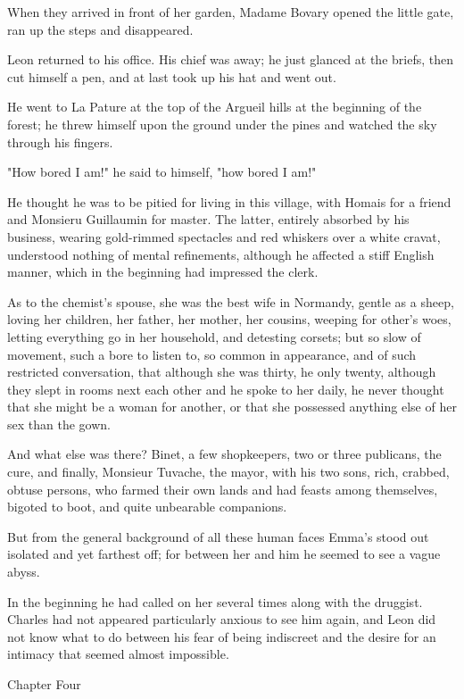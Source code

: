 \documentclass[11pt,twocolumn]{ltugboat}
\begin{document}
When they arrived in front of her garden, Madame Bovary opened the
little gate, ran up the steps and disappeared.

Leon returned to his office. His chief was away; he just glanced at the
briefs, then cut himself a pen, and at last took up his hat and went
out.

He went to La Pature at the top of the Argueil hills at the beginning of
the forest; he threw himself upon the ground under the pines and watched
the sky through his fingers.

"How bored I am!" he said to himself, "how bored I am!"

He thought he was to be pitied for living in this village, with Homais
for a friend and Monsieru Guillaumin for master. The latter, entirely
absorbed by his business, wearing gold-rimmed spectacles and red
whiskers over a white cravat, understood nothing of mental refinements,
although he affected a stiff English manner, which in the beginning had
impressed the clerk.

As to the chemist's spouse, she was the best wife in Normandy, gentle
as a sheep, loving her children, her father, her mother, her cousins,
weeping for other's woes, letting everything go in her household, and
detesting corsets; but so slow of movement, such a bore to listen to, so
common in appearance, and of such restricted conversation, that although
she was thirty, he only twenty, although they slept in rooms next each
other and he spoke to her daily, he never thought that she might be a
woman for another, or that she possessed anything else of her sex than
the gown.

And what else was there? Binet, a few shopkeepers, two or three
publicans, the cure, and finally, Monsieur Tuvache, the mayor, with his
two sons, rich, crabbed, obtuse persons, who farmed their own lands
and had feasts among themselves, bigoted to boot, and quite unbearable
companions.

But from the general background of all these human faces Emma's stood
out isolated and yet farthest off; for between her and him he seemed to
see a vague abyss.

In the beginning he had called on her several times along with the
druggist. Charles had not appeared particularly anxious to see him
again, and Leon did not know what to do between his fear of being
indiscreet and the desire for an intimacy that seemed almost impossible.



Chapter Four
\end{document}
